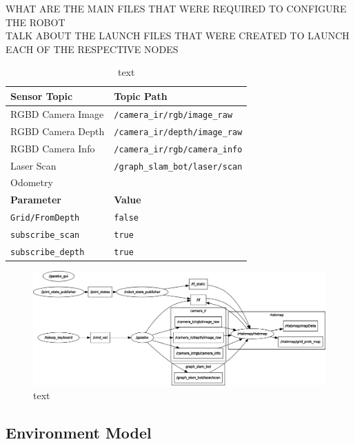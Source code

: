 \documentclass[a4paper]{article}
\begin{document}
WHAT ARE THE MAIN FILES THAT WERE REQUIRED TO CONFIGURE THE ROBOT\\

TALK ABOUT THE LAUNCH FILES THAT WERE CREATED TO LAUNCH EACH OF THE RESPECTIVE NODES

\begin{table}[h]
	\centering
	\caption{text}
	\begin{tabular}{ll}
		\toprule
		\textbf{Sensor Topic} & \textbf{Topic Path} \\
		\midrule
		RGBD Camera Image & \texttt{/camera\_ir/rgb/image\_raw} \\
		RGBD Camera Depth & \texttt{/camera\_ir/depth/image\_raw} \\
		RGBD Camera Info & \texttt{/camera\_ir/rgb/camera\_info} \\
		Laser Scan & \texttt{/graph\_slam\_bot/laser/scan} \\
		Odometry & \texttt{} \\ 
		\midrule
		\textbf{Parameter} & \textbf{Value}\\
		\midrule
		\texttt{Grid/FromDepth} & \texttt{false} \\
		\texttt{subscribe\_scan} & \texttt{true} \\
		\texttt{subscribe\_depth} & \texttt{true} \\
		\bottomrule
	\end{tabular}
\end{table}

\clearpage

\begin{figure}
	\centering
	\includegraphics[scale=0.4]{rosgraph}
	\caption{text}
\end{figure}

\clearpage

\subsection{Environment Model}
\end{document}
